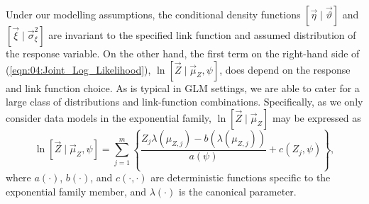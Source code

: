 \documentclass[12pt,a4paper]{article}
\begin{document}
Under our modelling assumptions, the conditional density functions  $[\vec{\eta}\mid\vec{\vartheta}]$ and $[\vec{\xi} \mid \vec{\sigma}^2_\xi]$ are invariant to the specified link function and assumed distribution of the response variable. 
On the other hand, the first term on the right-hand side of (\ref{eqn:04:Joint_Log_Likelihood}), $\ln{[\vec{Z} \mid \vec{\mu}_Z, \psi]}$, does depend on the response and link function choice. 
As is typical in GLM settings, we are able to cater for a large class of distributions and link-function combinations. 
Specifically, as we only consider data models in the exponential family, $\ln{[\vec{Z}  \mid  \vec{\mu}_Z]}$ may be expressed as  
\begin{equation}\label{eqn:ln[Z|Y],ExpFam}
\ln{[\vec{Z} \mid \vec{\mu}_Z, \psi]}
=
\sum_{j=1}^m\left\{
\frac{Z_j\lambda(\mu_{Z, j}) - b(\lambda(\mu_{Z, j}))}{a(\psi)} + c(Z_j, \psi)\right\},
\end{equation}
where $a(\cdot)$, $b(\cdot)$, and $c(\cdot, \cdot)$ are deterministic functions specific to the exponential family member, and $\lambda(\cdot)$ is the canonical parameter. %
\end{document}
